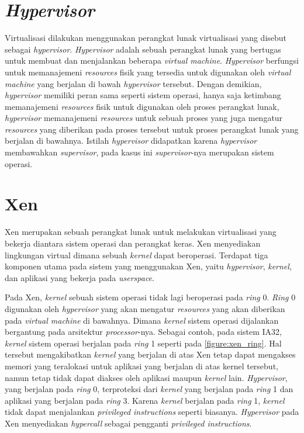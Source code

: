 \section{\textit{Hypervisor}}

Virtualisasi dilakukan menggunakan perangkat lunak virtualisasi yang disebut sebagai \textit{hypervisor}.
\textit{Hypervisor} adalah sebuah perangkat lunak yang bertugas untuk membuat dan menjalankan beberapa \textit{virtual machine}.
\textit{Hypervisor} berfungsi untuk memanajemeni \textit{resources} fisik yang tersedia untuk digunakan oleh \textit{virtual machine} yang berjalan di bawah \textit{hypervisor} tersebut.
Dengan demikian, \textit{hypervisor} memiliki peran sama seperti sistem operasi, hanya saja ketimbang memanajemeni \textit{resources} fisik untuk digunakan oleh proses perangkat lunak, \textit{hypervisor} memanajemeni \textit{resources} untuk sebuah proses yang juga mengatur \textit{resources} yang diberikan pada proses tersebut untuk proses perangkat lunak yang berjalan di bawahnya.
Istilah \textit{hypervisor} didapatkan karena \textit{hypervisor} membawahkan \textit{supervisor}, pada kasus ini \textit{supervisor}-nya merupakan sistem operasi.

\section{Xen}

Xen merupakan sebuah perangkat lunak untuk melakukan virtualisasi yang bekerja diantara sistem operasi dan perangkat keras.
Xen menyediakan lingkungan virtual dimana sebuah \textit{kernel} dapat beroperasi.
Terdapat tiga komponen utama pada sistem yang menggunakan Xen, yaitu \textit{hypervisor}, \textit{kernel}, dan aplikasi yang bekerja pada \textit{userspace}.

Pada Xen, \textit{kernel} sebuah sistem operasi tidak lagi beroperasi pada \textit{ring} 0.
\textit{Ring} 0 digunakan oleh \textit{hypervisor} yang akan mengatur \textit{resources} yang akan diberikan pada \textit{virtual machine} di bawahnya.
Dimana \textit{kernel} sistem operasi dijalankan bergantung pada arsitektur \textit{processor}-nya.
Sebagai contoh, pada sistem IA32, \textit{kernel} sistem operasi berjalan pada \textit{ring} 1 seperti pada \autoref{figure:xen_ring}.
Hal tersebut mengakibatkan \textit{kernel} yang berjalan di atas Xen tetap dapat mengakses memori yang teralokasi untuk aplikasi yang berjalan di atas kernel tersebut, namun tetap tidak dapat diakses oleh aplikasi maupun \textit{kernel} lain.
\textit{Hypervisor}, yang berjalan pada \textit{ring} 0, terproteksi dari \textit{kernel} yang berjalan pada \textit{ring} 1 dan aplikasi yang berjalan pada \textit{ring} 3.
Karena \textit{kernel} berjalan pada \textit{ring} 1, \textit{kernel} tidak dapat menjalankan \textit{privileged instructions} seperti biasanya.
\textit{Hypervisor} pada Xen menyediakan \textit{hypercall} sebagai pengganti \textit{privileged instructions}.

